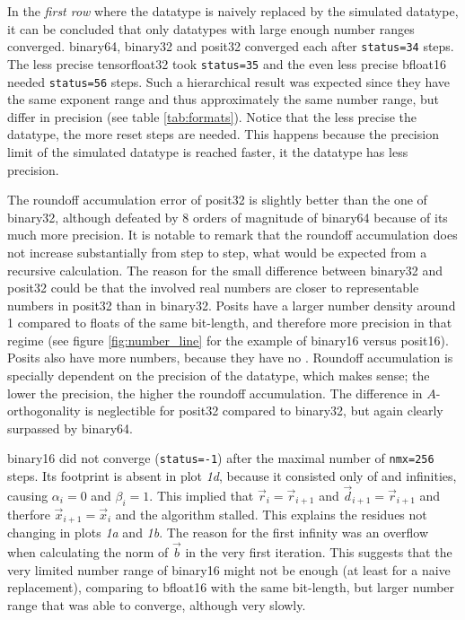 \documentclass{article}
\theoremstyle{plain} %
\theoremstyle{remark} %
\def\code#1{\texttt{#1}}
\numberwithin{equation}{section}
\begin{document}
In the \textit{first row} where the datatype is naively replaced by the simulated datatype, it can be concluded that only datatypes with large enough number ranges converged. \gls{binary64}, \gls{binary32} and \gls{posit32} converged each after \code{status=34} steps. The less precise \gls{tensorfloat32} took \code{status=35} and the even less precise \gls{bfloat16} needed \code{status=56} steps. Such a hierarchical result was expected since they have the same exponent range and thus approximately the same number range, but differ in precision (see table \ref{tab:formats}). Notice that the less precise the datatype, the more reset steps are needed. This happens because the precision limit of the simulated datatype is reached faster, it the datatype has less precision.

The roundoff accumulation error of \gls{posit32} is slightly better than the one of \gls{binary32}, although defeated by $8$ orders of magnitude of \gls{binary64} because of its much more precision. It is notable to remark that the roundoff accumulation does not increase substantially from step to step, what would be expected from a recursive calculation. The reason for the small difference between \gls{binary32} and \gls{posit32} could be that the involved real numbers are closer to representable numbers in \gls{posit32} than in \gls{binary32}. Posits have a larger number density around \num{1} compared to floats of the same bit-length, and therefore more precision in that regime (see figure \ref{fig:number_line} for the example of \gls{binary16} versus \gls{posit16}). Posits also have more numbers, because they have no . Roundoff accumulation is specially dependent on the precision of the datatype, which makes sense; the lower the precision, the higher the roundoff accumulation. The difference in $A$-orthogonality is neglectible for \gls{posit32} compared to \gls{binary32}, but again clearly surpassed by \gls{binary64}.

\gls{binary16} did not converge (\code{status=-1}) after the maximal number of \code{nmx=256} steps. Its footprint is absent in plot \textit{1d}, because it consisted only of  and infinities, causing $\alpha_i = 0$ and $\beta_i = 1$. This implied that $\vec{r}_i = \vec{r}_{i+1}$ and $\vec{d}_{i+1} = \vec{r}_{i+1}$ and therfore $\vec{x}_{i+1} = \vec{x}_{i}$ and the algorithm stalled. This explains the residues not changing in plots \textit{1a} and \textit{1b}. The reason for the first infinity was an overflow when calculating the norm of $\vec{b}$ in the very first iteration. This suggests that the very limited number range of \gls{binary16} might not be enough (at least for a naive replacement), comparing to \gls{bfloat16} with the same bit-length, but larger number range that was able to converge, although very slowly.
\end{document}
